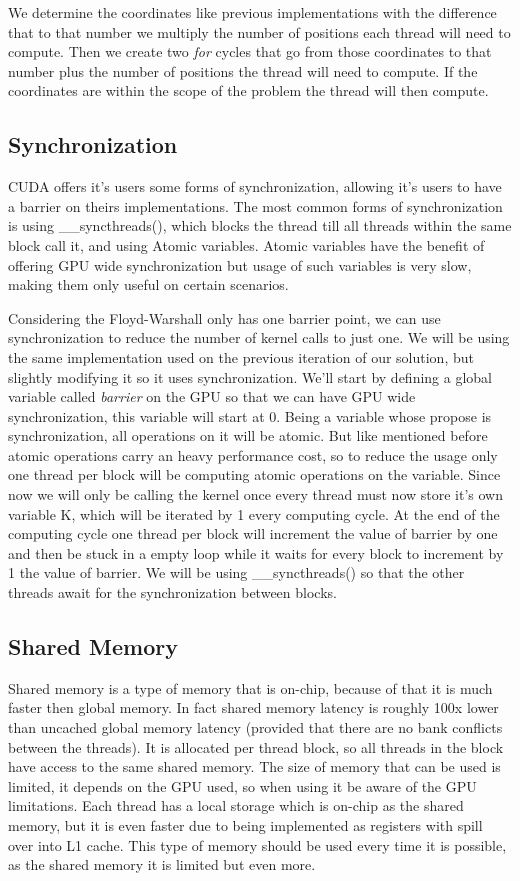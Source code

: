 \documentclass[runningheads]{llncs}
\begin{document}
We determine the coordinates like previous implementations with the difference that to that number we multiply the number of positions each thread will need to compute. %
Then we create two \textit{for} cycles that go from those coordinates to that number plus the number of positions the thread will need to compute. If the coordinates are within the scope of the problem the thread will then compute.

\subsection{Synchronization}

CUDA offers it's users some forms of synchronization, allowing it's users to have a barrier on theirs implementations.
The most common forms of synchronization is using \_\_syncthreads(), which blocks the thread till all threads within the same block call it, and using Atomic variables. Atomic variables have the benefit of offering GPU wide synchronization but usage of such variables is very slow, making them only useful on certain scenarios.

Considering the Floyd-Warshall only has one barrier point, we can use synchronization to reduce the number of kernel calls to just one.
We will be using the same implementation used on the previous iteration of our solution, but slightly modifying it so it uses synchronization.
We'll start by defining a global variable called \textit{barrier} on the GPU so that we can have GPU wide synchronization, this variable will start at 0. 
Being a variable whose propose is synchronization, all operations on it will be atomic. 
But like mentioned before atomic operations carry an heavy performance cost, so to reduce the usage only one thread per block will be computing atomic operations on the variable.
Since now we will only be calling the kernel once every thread must now store it's own variable K, which will be iterated by 1 every computing cycle. 
At the end of the computing cycle one thread per block will increment the value of barrier by one and then be stuck in a empty loop while it waits for every block to increment by 1 the value of barrier. 
We will be using \_\_syncthreads() so that the other threads await for the synchronization between blocks.


\subsection{Shared Memory}
Shared memory is a type of memory that is on-chip, because of that it is much faster then global memory. In fact shared memory latency is roughly 
100x lower than uncached global memory latency (provided that there are no bank conflicts between the threads). It is allocated per 
thread block, so all threads in the block have access to the same shared memory. The size of memory that can be used is limited, it depends on the GPU
used, so when using it be aware of the GPU limitations.
Each thread has a local storage which is on-chip as the shared memory, but it is even faster due to being implemented as registers with spill over
into L1 cache. This type of memory should be used every time it is possible, as the shared memory it is limited but even more.
\end{document}
